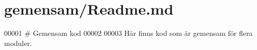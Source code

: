 \hypertarget{gemensam_2_readme_8md_source}{}\section{gemensam/\+Readme.md}

\begin{DoxyCode}
00001 # Gemensam kod
00002 
00003 Här finns kod som är gemensam för flera moduler.
\end{DoxyCode}
